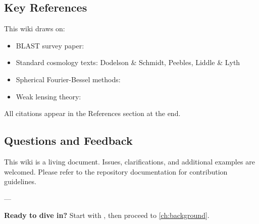 \subsection{Key References}\label{subsec:intro_references}

This wiki draws on:

\begin{itemize}
    \item BLAST survey paper: \cite{BLAST2024}
    \item Standard cosmology texts: Dodelson \& Schmidt, Peebles, Liddle \& Lyth
    \item Spherical Fourier-Bessel methods: \cite{SFB_methods}
    \item Weak lensing theory: \cite{WeakLensingReview}
\end{itemize}

All citations appear in the References section at the end.

\subsection{Questions and Feedback}\label{subsec:intro_feedback}

This wiki is a living document. Issues, clarifications, and additional examples are welcomed. Please refer to the repository documentation for contribution guidelines.

---

\noindent
\textbf{Ready to dive in?} Start with , then proceed to \cref{ch:background}.

